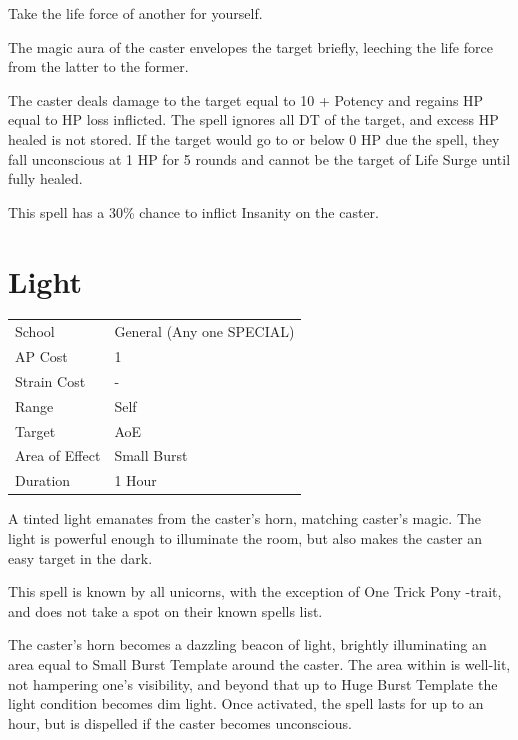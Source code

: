 \documentclass[11pt,a4paper,twocolumn]{book}
\begin{document}
\medskip

Take the life force of another for yourself.

The magic aura of the caster envelopes the target briefly, leeching the life force from the latter to the former.

The caster deals damage to the target equal to 10 + Potency and regains HP equal to HP loss inflicted. The spell ignores all DT of the target, and excess HP healed is not stored. If the target would go to or below 0 HP due the spell, they fall unconscious at 1 HP for 5 rounds and cannot be the target of Life Surge until fully healed.

This spell has a 30\% chance to inflict Insanity on the caster.


\section*{Light}
{
	\begin{tabu} to 75mm{| X[l,4] | X[l,7] |}
		\hline
		School 			& General (Any one SPECIAL) 		\\
        AP Cost	      	& 1 								\\
        Strain Cost     & - 								\\
        Range     		& Self 								\\
        Target      	& AoE								\\
        Area of Effect  & Small Burst  	 					\\
        Duration     	& 1 Hour							\\ \hline
	\end{tabu}
		
}

\medskip

A tinted light emanates from the caster's horn, matching caster's magic. The light is powerful enough to illuminate the room, but also makes the caster an easy target in the dark.

This spell is known by all unicorns, with the exception of One Trick Pony -trait, and does not take a spot on their known spells list.
 
The caster's horn becomes a dazzling beacon of light, brightly illuminating an area equal to Small Burst Template around the caster. The area within is well-lit, not hampering one's visibility, and beyond that up to Huge Burst Template the light condition becomes dim light. Once activated, the spell lasts for up to an hour, but is dispelled if the caster becomes unconscious.
\end{document}

